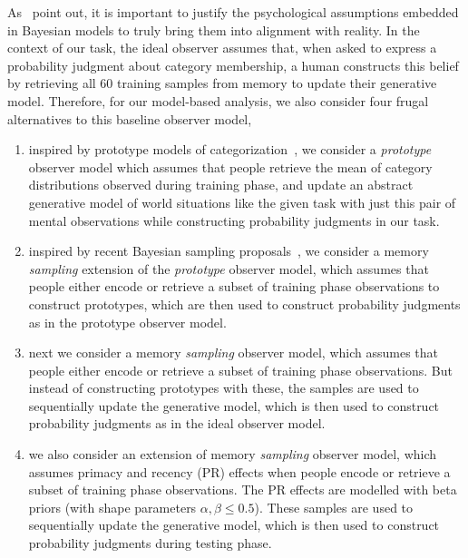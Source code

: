 \documentclass[10pt,letterpaper]{article}
\begin{document}
As~ point out, it is important to justify the psychological assumptions embedded in Bayesian models to truly bring them into alignment with reality. In the context of our task, the ideal observer assumes that, when asked to express a probability judgment about category membership, a human constructs this belief by retrieving all 60 training samples from memory to update their generative model. Therefore, for our model-based analysis, we also consider four frugal alternatives to this baseline observer model,
\begin{enumerate}
    \item inspired by prototype models of categorization~\cite{fried1984induction, minda2001prototypes}, we consider a {\em prototype} observer model which assumes that people retrieve the mean of category distributions observed during training phase, and update an abstract generative model of world situations like the given task with just this pair of mental observations while constructing probability judgments in our task. 
    \item inspired by recent Bayesian sampling proposals~\cite{sanborn2016bayesian, zhu2020bayesian}, we consider a memory {\em sampling} extension of the {\em prototype} observer model, which assumes that people either encode or retrieve a subset of training phase observations to construct prototypes, which are then used to construct probability judgments as in the prototype observer model. 
    \item next we consider a memory {\em sampling}  observer model, which assumes that people either encode or retrieve a subset of training phase observations. But instead of constructing prototypes with these, the samples are used to sequentially update the generative model, which is then used to construct probability judgments as in the ideal observer model. 
    \item we also consider an extension of memory {\em sampling}  observer model, which assumes primacy and recency (PR) effects when people encode or retrieve a subset of training phase observations. The PR effects are modelled with beta priors (with shape parameters $\alpha , \beta \le 0.5$). These samples are used to sequentially update the generative model, which is then used to construct probability judgments during testing phase.
\end{enumerate}
\end{document}
